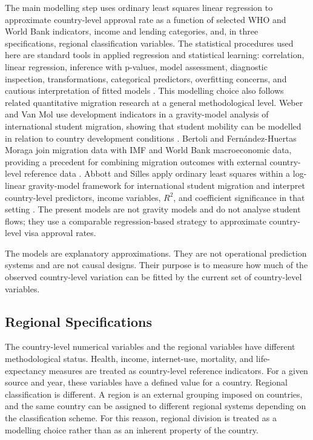 \documentclass[runningheads]{llncs}
\begin{document}
The main modelling step uses ordinary least squares linear regression to approximate country-level approval rate as a function of selected WHO and World Bank indicators, income and lending categories, and, in three specifications, regional classification variables. The statistical procedures used here are standard tools in applied regression and statistical learning: correlation, linear regression, inference with p-values, model assessment, diagnostic inspection, transformations, categorical predictors, overfitting concerns, and cautious interpretation of fitted models \cite{James2021}. This modelling choice also follows related quantitative migration research at a general methodological level. Weber and Van Mol use development indicators in a gravity-model analysis of international student migration, showing that student mobility can be modelled in relation to country development conditions \cite{Weber2023}. Bertoli and Fern{\'a}ndez-Huertas Moraga join migration data with IMF and World Bank macroeconomic data, providing a precedent for combining migration outcomes with external country-level reference data \cite{Bertoli2013}. Abbott and Silles apply ordinary least squares within a log-linear gravity-model framework for international student migration and interpret country-level predictors, income variables, $R^2$, and coefficient significance in that setting \cite{Abbott2016}. The present models are not gravity models and do not analyse student flows; they use a comparable regression-based strategy to approximate country-level visa approval rates.

The models are explanatory approximations. They are not operational prediction systems and are not causal designs. Their purpose is to measure how much of the observed country-level variation can be fitted by the current set of country-level variables.

\subsection{Regional Specifications}

The country-level numerical variables and the regional variables have different methodological status. Health, income, internet-use, mortality, and life-expectancy measures are treated as country-level reference indicators. For a given source and year, these variables have a defined value for a country. Regional classification is different. A region is an external grouping imposed on countries, and the same country can be assigned to different regional systems depending on the classification scheme. For this reason, regional division is treated as a modelling choice rather than as an inherent property of the country.
\end{document}
